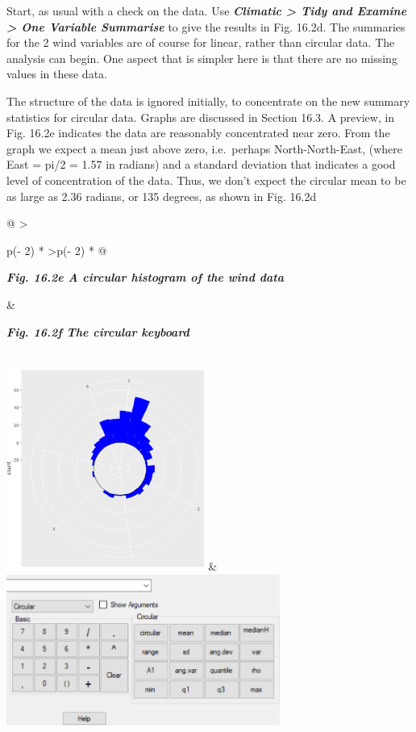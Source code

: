 \documentclass[
  letterpaper,
  DIV=11,
  numbers=noendperiod]{scrreprt}
\begin{document}
Start, as usual with a check on the data. Use \textbf{\emph{Climatic
\textgreater{} Tidy and Examine \textgreater{} One Variable Summarise}}
to give the results in Fig. 16.2d. The summaries for the 2 wind
variables are of course for linear, rather than circular data. The
analysis can begin. One aspect that is simpler here is that there are no
missing values in these data.

The structure of the data is ignored initially, to concentrate on the
new summary statistics for circular data. Graphs are discussed in
Section 16.3. A preview, in Fig. 16.2e indicates the data are reasonably
concentrated near zero. From the graph we expect a mean just above zero,
i.e.~perhaps North-North-East, (where East = pi/2 = 1.57 in radians) and
a standard deviation that indicates a good level of concentration of the
data. Thus, we don't expect the circular mean to be as large as 2.36
radians, or 135 degrees, as shown in Fig. 16.2d

\begin{longtable}[]{@{}
  >{\raggedright\arraybackslash}p{(\columnwidth - 2\tabcolsep) * }
  >{\raggedleft\arraybackslash}p{(\columnwidth - 2\tabcolsep) * }@{}}
\toprule\noalign{}
\begin{minipage}[b]{\linewidth}\raggedright
\textbf{\emph{Fig. 16.2e A circular histogram of the wind data}}
\end{minipage} & \begin{minipage}[b]{\linewidth}\raggedleft
\textbf{\emph{Fig. 16.2f The circular keyboard}}
\end{minipage} \\
\midrule\noalign{}
\endhead
\bottomrule\noalign{}
\endlastfoot
\includegraphics[width=2.55701in,height=2.62856in]{figures/Fig16.2e.png}
&
\includegraphics[width=3.53404in,height=1.94911in]{figures/Fig16.2f.png} \\
\end{longtable}
\end{document}

